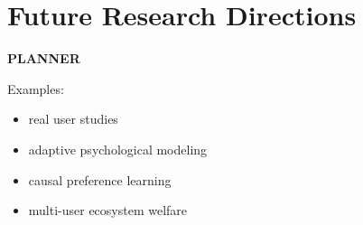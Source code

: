 \section{Future Research Directions}

\textbf{PLANNER}

Examples:

\begin{itemize}
    \item real user studies
    \item adaptive psychological modeling
    \item causal preference learning
    \item multi-user ecosystem welfare
\end{itemize}